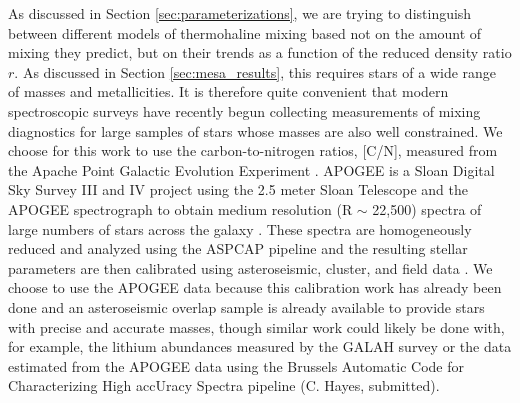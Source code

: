 As discussed in Section \ref{sec:parameterizations}, we are trying to distinguish between different models of thermohaline mixing based not on the amount of mixing they predict, but on their trends as a function of the reduced density ratio $r$. As discussed in Section \ref{sec:mesa_results}, this requires stars of a wide range of masses and metallicities. It is therefore quite convenient that 
modern spectroscopic surveys have recently begun collecting measurements of mixing diagnostics for large samples of stars whose masses are also well constrained. 
%
We choose for this work to use the carbon-to-nitrogen ratios, [C/N], measured from the Apache Point Galactic Evolution Experiment \citep[APOGEE, ][]{Majewski2017}. APOGEE is a Sloan Digital Sky Survey III and IV \citep{Blanton2017} project using the 2.5 meter Sloan Telescope \citep{Gunn2006} and the APOGEE spectrograph \citep{Wilson2019} to obtain medium resolution (R $\sim$ 22,500) spectra of large numbers of stars across the galaxy \citep{Zasowski2017, Beaton2021,Santana2021}. These spectra are homogeneously reduced and analyzed using the ASPCAP pipeline \citep{Nidever2015, Zamora2015, GarciaPerez2016} and the resulting stellar parameters are then calibrated using asteroseismic, cluster, and field data \citep{Holtzman2015,Holtzman2018, Jonsson2020}. We choose to use the APOGEE data because this calibration work has already been done and an asteroseismic overlap sample is already available to provide stars with precise and accurate masses, though %
similar work could likely be done with, for example, the lithium abundances measured by the GALAH survey \citep{buder2019} or the \ctwelvecthirteen data estimated from the APOGEE data using the Brussels Automatic Code for Characterizing High accUracy Spectra \citep[BACCHUS,][]{Masseron2016_BACCHUS} pipeline (C. Hayes, submitted). 

